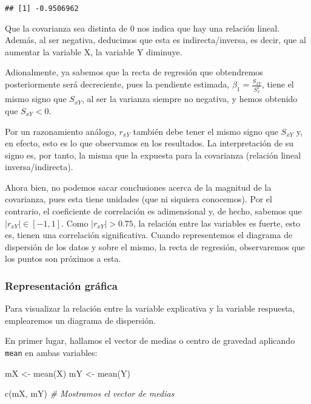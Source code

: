 \documentclass[
]{article}
\newenvironment{Shaded}{\begin{snugshade}}{\end{snugshade}}
\newcommand{\CommentTok}[1]{\textcolor[rgb]{0.56,0.35,0.01}{\textit{#1}}}
\newcommand{\FunctionTok}[1]{\textcolor[rgb]{0.00,0.00,0.00}{#1}}
\newcommand{\NormalTok}[1]{#1}
\newcommand{\OtherTok}[1]{\textcolor[rgb]{0.56,0.35,0.01}{#1}}
\begin{document}
\begin{verbatim}
## [1] -0.9506962
\end{verbatim}

Que la covarianza sea distinta de 0 nos indica que hay una relación
lineal. Además, al ser negativa, deducimos que esta es
indirecta/inversa, es decir, que al aumentar la variable X, la variable
Y diminuye.

Adionalmente, ya sabemos que la recta de regresión que obtendremos
posteriormente será decreciente, pues la pendiente estimada,
\(\beta_1 = \frac{S_{xY}}{S_x^2}\), tiene el mismo signo que \(S_{xY}\),
al ser la varianza siempre no negativa, y hemos obtenido que
\(S_{xY} < 0\).

Por un razonamiento análogo, \(r_{xY}\) también debe tener el mismo
signo que \(S_{xY}\) y, en efecto, esto es lo que observamos en los
resultados. La interpretación de su signo es, por tanto, la misma que la
expuesta para la covarianza (relación lineal inversa/indirecta).

Ahora bien, no podemos sacar conclusiones acerca de la magnitud de la
covarianza, pues esta tiene unidades (que ni siquiera conocemos). Por el
contrario, el coeficiente de correlación es adimensional y, de hecho,
sabemos que \(|r_{xY}| \in [-1,1]\). Como \(|r_{xY}| > 0.75\), la
relación entre las variables es fuerte, esto es, tienen una correlación
significativa. Cuando representemos el diagrama de dispersión de los
datos y sobre el mismo, la recta de regresión, observaremos que los
puntos son próximos a esta.

\hypertarget{representaciuxf3n-gruxe1fica}{%
\subsubsection{Representación
gráfica}\label{representaciuxf3n-gruxe1fica}}

Para visualizar la relación entre la variable explicativa y la variable
respuesta, emplearemos un diagrama de dispersión.

En primer lugar, hallamos el vector de medias o centro de gravedad
aplicando \texttt{mean} en ambas variables:

\begin{Shaded}
\begin{Highlighting}[]
\NormalTok{mX }\OtherTok{\textless{}{-}} \FunctionTok{mean}\NormalTok{(X)}
\NormalTok{mY }\OtherTok{\textless{}{-}} \FunctionTok{mean}\NormalTok{(Y)}

\FunctionTok{c}\NormalTok{(mX, mY) }\CommentTok{\# Mostramos el vector de medias}
\end{Highlighting}
\end{Shaded}
\end{document}
